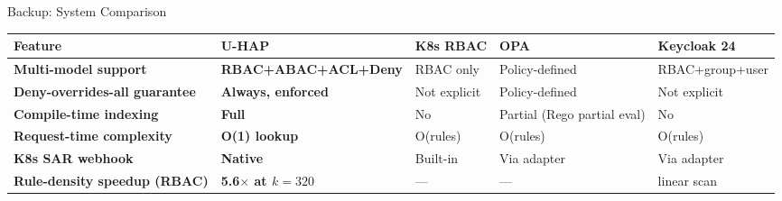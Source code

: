 \documentclass[aspectratio=169,10pt]{beamer}
\begin{document}
\begin{frame}[t,noframenumbering]{Backup: System Comparison}
\vspace{5pt}
\centering
\setlength{\tabcolsep}{3pt}
\renewcommand{\arraystretch}{1.5}
\begin{tabular}{@{}>{\tiny\bfseries}p{3.6cm} >{\centering\tiny}p{2.1cm} >{\centering\tiny}p{2.0cm} >{\centering\tiny}p{1.9cm} >{\centering\arraybackslash\tiny}p{2.3cm}@{}}
\toprule
\rowcolor{uhapGray}
\textbf{Feature} & \textbf{U-HAP} & \textbf{K8s RBAC} & \textbf{OPA} & \textbf{Keycloak 24} \\
\midrule
Multi-model support
  & \textbf{\color{uhapGreen}RBAC+ABAC+\allowbreak ACL+Deny}
  & RBAC only
  & Policy-defined
  & RBAC+group+user \\
Deny-overrides-all guarantee
  & \textbf{\color{uhapGreen}Always, enforced}
  & Not explicit
  & Policy-defined
  & Not explicit \\
Compile-time indexing
  & \textbf{\color{uhapGreen}Full}
  & No
  & Partial (Rego partial eval)
  & No \\
Request-time complexity
  & \textbf{\color{uhapGreen}O(1) lookup}
  & O(rules)
  & O(rules)
  & O(rules) \\
K8s SAR webhook
  & \textbf{\color{uhapGreen}Native}
  & Built-in
  & Via adapter
  & Via adapter \\
Rule-density speedup (RBAC)
  & \textbf{\color{uhapGreen}5.6$\times$ at $k{=}320$}
  & ---
  & ---
  & linear scan \\
\bottomrule
\end{tabular}
\end{frame}
\end{document}
